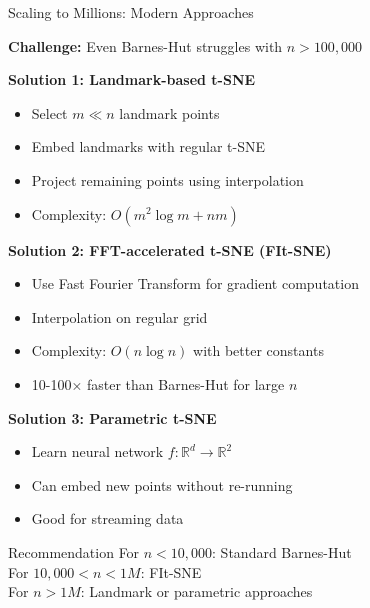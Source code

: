 \documentclass[10pt]{beamer}
\begin{document}
\begin{frame}{Scaling to Millions: Modern Approaches}

\textbf{Challenge:} Even Barnes-Hut struggles with $n > 100,000$

\vspace{0.2cm}
\textbf{Solution 1: Landmark-based t-SNE}
\begin{itemize}
    \setlength\itemsep{0em}
    \item Select $m \ll n$ landmark points
    \item Embed landmarks with regular t-SNE
    \item Project remaining points using interpolation
    \item Complexity: $O(m^2 \log m + nm)$
\end{itemize}

\vspace{0.15cm}
\textbf{Solution 2: FFT-accelerated t-SNE (FIt-SNE)}
\begin{itemize}
    \setlength\itemsep{0em}
    \item Use Fast Fourier Transform for gradient computation
    \item Interpolation on regular grid
    \item Complexity: $O(n \log n)$ with better constants
    \item 10-100× faster than Barnes-Hut for large $n$
\end{itemize}

\vspace{0.15cm}
\textbf{Solution 3: Parametric t-SNE}
\begin{itemize}
    \setlength\itemsep{0em}
    \item Learn neural network $f: \mathbb{R}^d \rightarrow \mathbb{R}^2$
    \item Can embed new points without re-running
    \item Good for streaming data
\end{itemize}

\vspace{0.1cm}
\begin{alertblock}{Recommendation}
\footnotesize
For $n < 10,000$: Standard Barnes-Hut\\
For $10,000 < n < 1M$: FIt-SNE\\
For $n > 1M$: Landmark or parametric approaches
\end{alertblock}

\end{frame}
\end{document}
